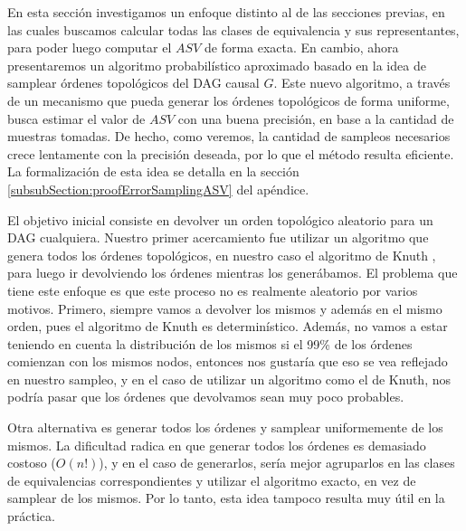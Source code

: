En esta sección investigamos un enfoque distinto al de las secciones previas, en las cuales buscamos calcular todas las clases de equivalencia y sus representantes, para poder luego computar el $ASV$ de forma exacta. En cambio, ahora presentaremos un algoritmo probabilístico aproximado basado en la idea de samplear órdenes topológicos del DAG causal $G$.
Este nuevo algoritmo, a través de un mecanismo que pueda generar los órdenes topológicos de forma uniforme, busca estimar el valor de $ASV$ con una buena precisión, en base a la cantidad de muestras tomadas. De hecho, como veremos, la cantidad de sampleos necesarios crece lentamente con la precisión deseada, por lo que el método resulta eficiente. La formalización de esta idea se detalla en la sección \ref{subsubSection:proofErrorSamplingASV} del apéndice.


El objetivo inicial consiste en devolver un orden topológico aleatorio para un DAG cualquiera. Nuestro primer acercamiento fue utilizar un algoritmo que genera todos los órdenes topológicos, en nuestro caso el algoritmo de Knuth \cite{algorithmForAllTopoSorts}, para luego ir devolviendo los órdenes mientras los generábamos. El problema que tiene este enfoque es que este proceso no es realmente aleatorio por varios motivos. Primero, siempre vamos a devolver los mismos y además en el mismo orden, pues el algoritmo de Knuth es determinístico. Además, no vamos a estar teniendo en cuenta la distribución de los mismos si el 99\% de los órdenes comienzan con los mismos nodos, entonces nos gustaría que eso se vea reflejado en nuestro sampleo, y en el caso de utilizar un algoritmo como el de Knuth, nos podría pasar que los órdenes que devolvamos sean muy poco probables. 

Otra alternativa es generar todos los órdenes y samplear uniformemente de los mismos. La dificultad radica en que generar todos los órdenes es demasiado costoso ($O(n!)$), y en el caso de generarlos, sería mejor agruparlos en las clases de equivalencias correspondientes y utilizar el algoritmo exacto, en vez de samplear de los mismos. Por lo tanto, esta idea tampoco resulta muy útil en la práctica. 


